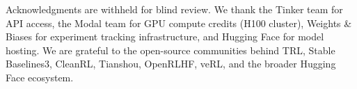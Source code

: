 \documentclass{article}
\begin{document}




\label{sec:acknowledgments}
\begin{ack}
Acknowledgments are withheld for blind review. We thank the Tinker team for
API access, the Modal team for GPU compute credits (H100 cluster), Weights
\& Biases for experiment tracking infrastructure, and Hugging Face for model
hosting. We are grateful to the open-source communities behind TRL, Stable
Baselines3, CleanRL, Tianshou, OpenRLHF, veRL, and the broader Hugging Face
ecosystem.
\end{ack}




\appendix






\end{document}
